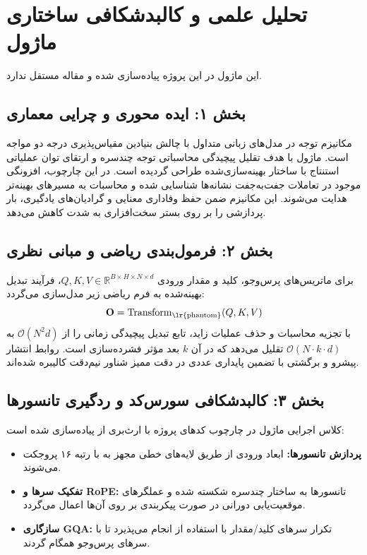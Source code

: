 \section{تحلیل علمی و کالبدشکافی ساختاری ماژول }

این ماژول در این پروژه پیاده‌سازی شده و مقاله مستقل ندارد.
\label{sec:phantom}

\subsection*{بخش ۱: ایده محوری و چرایی معماری }
مکانیزم توجه در مدل‌های زبانی متداول با چالش بنیادین مقیاس‌پذیری درجه دو مواجه است. ماژول  با هدف تقلیل پیچیدگی محاسباتی توجه چندسره و ارتقای توان عملیاتی استنتاج با ساختار بهینه‌سازی‌شده طراحی گردیده است. در این چارچوب، افزونگی موجود در تعاملات جفت‌به‌جفت نشانه‌ها شناسایی شده و محاسبات به مسیرهای بهینه‌تر هدایت می‌شوند. این مکانیزم ضمن حفظ وفاداری معنایی و گرادیان‌های یادگیری، بار پردازشی را بر روی بستر سخت‌افزاری به شدت کاهش می‌دهد.

\subsection*{بخش ۲: فرمول‌بندی ریاضی و مبانی نظری }
برای ماتریس‌های پرس‌وجو، کلید و مقدار ورودی $Q, K, V \in \mathbb{R}^{B \times H \times N \times d}$، فرآیند تبدیل بهینه‌شده به فرم ریاضی زیر مدل‌سازی می‌گردد:
\begin{equation}
\mathbf{O} = \operatorname{Transform}_{\text{\lr{phantom}}}(Q, K, V)
\end{equation}
با تجزیه محاسبات و حذف عملیات زاید، تابع تبدیل پیچیدگی زمانی را از $\mathcal{O}(N^2 d)$ به $\mathcal{O}(N \cdot k \cdot d)$ تقلیل می‌دهد که در آن $k$ بعد مؤثر فشرده‌سازی است. روابط انتشار پیشرو و برگشتی با تضمین پایداری عددی در دقت ممیز شناور نیم‌دقت  کالیبره شده‌اند.

\subsection*{بخش ۳: کالبدشکافی سورس‌کد و ردگیری تانسورها }
کلاس اجرایی ماژول در چارچوب کدهای پروژه با ارث‌بری از  پیاده‌سازی شده است:
\begin{itemize}
    \item \textbf{پردازش تانسورها:} ابعاد ورودی \lr{$[B, N, D]$} از طریق لایه‌های خطی مجهز به  با رتبه ۱۶ پروجکت می‌شوند.
    \item \textbf{تفکیک سرها و RoPE:} تانسورها به ساختار چندسره \lr{$[B, H, N, d]$} شکسته شده و عملگرهای موقعیت‌یابی دورانی در صورت پیکربندی بر روی آن‌ها اعمال می‌گردد.
    \item \textbf{سازگاری GQA:} تکرار سرهای کلید/مقدار با استفاده از  انجام می‌پذیرد تا با سرهای پرس‌وجو همگام گردند.
\end{itemize}

